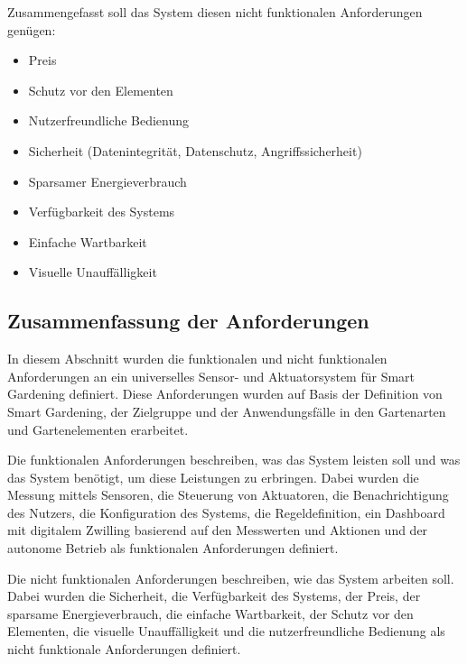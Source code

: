 Zusammengefasst soll das System diesen nicht funktionalen Anforderungen genügen:
\begin{itemize}
	\item Preis
	\item Schutz vor den Elementen
	\item Nutzerfreundliche Bedienung
	\item Sicherheit (Datenintegrität, Datenschutz, Angriffssicherheit)
	\item Sparsamer Energieverbrauch
	\item Verfügbarkeit des Systems
	\item Einfache Wartbarkeit
	\item Visuelle Unauffälligkeit
\end{itemize}

\subsection{Zusammenfassung der Anforderungen}
In diesem Abschnitt wurden die funktionalen und nicht funktionalen Anforderungen an ein universelles Sensor- und Aktuatorsystem für Smart Gardening definiert.
Diese Anforderungen wurden auf Basis der Definition von Smart Gardening, der Zielgruppe und der Anwendungsfälle in den Gartenarten und Gartenelementen erarbeitet.

Die funktionalen Anforderungen beschreiben, was das System leisten soll und was das System benötigt, um diese Leistungen zu erbringen.
Dabei wurden die Messung mittels Sensoren, die Steuerung von Aktuatoren, die Benachrichtigung des Nutzers, die Konfiguration des Systems, die Regeldefinition, ein Dashboard mit digitalem Zwilling basierend auf den Messwerten und Aktionen und der autonome Betrieb als funktionalen Anforderungen definiert.

Die nicht funktionalen Anforderungen beschreiben, wie das System arbeiten soll.
Dabei wurden die Sicherheit, die Verfügbarkeit des Systems, der Preis, der sparsame Energieverbrauch, die einfache Wartbarkeit, der Schutz vor den Elementen, die visuelle Unauffälligkeit und die nutzerfreundliche Bedienung als nicht funktionale Anforderungen definiert.



